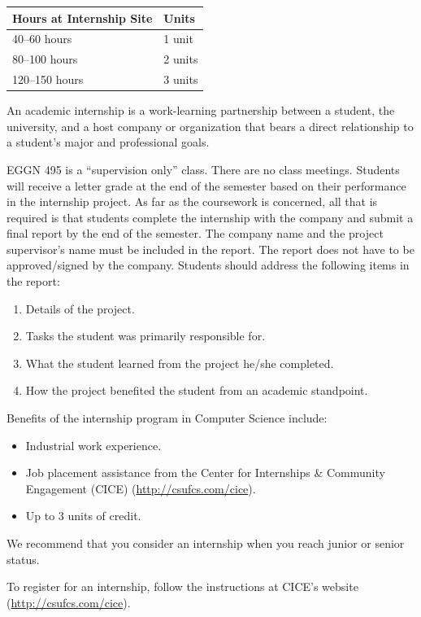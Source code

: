 \documentclass{book}
\newcommand{\shrunkurl}[1]{\url{http://csufcs.com/#1}}
\begin{document}
\begin{center}
\begin{tabular}{|l|l|} \hline
  \textbf{Hours at Internship Site} & \textbf{Units} \\ \hline
  40--60 hours & 1 unit \\ \hline
  80--100 hours & 2 units \\ \hline
  120--150 hours & 3 units \\ \hline
\end{tabular}
\end{center}

An academic internship is a work-learning partnership between a
student, the university, and a host company or organization that bears
a direct relationship to a student’s major and professional goals.

EGGN 495 is a ``supervision only'' class. There are no class
meetings. Students will receive a letter grade at the end of the
semester based on their performance in the internship project. As far
as the coursework is concerned, all that is required is that students
complete the internship with the company and submit a final report by
the end of the semester. The company name and the project supervisor's
name must be included in the report. The report does not have to be
approved/signed by the company. Students should address the following
items in the report:
\begin{enumerate}
\item Details of the project.
\item Tasks the student was primarily responsible for.
\item What the student learned from the project he/she completed.
\item How the project benefited the student from an academic standpoint.
\end{enumerate}

Benefits of the internship program in Computer Science include:
\begin{itemize}
\item Industrial work experience.
\item Job placement assistance from the Center for Internships \& Community Engagement (CICE) (\shrunkurl{cice}).
\item Up to 3 units of credit.
\end{itemize}

We recommend that you consider an internship when you reach junior or senior status.

To register for an internship, follow the instructions at CICE's website (\shrunkurl{cice}).
\end{document}
